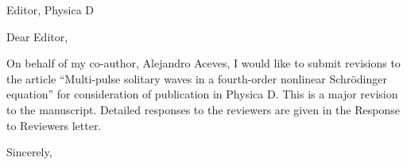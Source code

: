 \documentclass[11pt]{letter}
\begin{document}
\address{Ross Parker \\
Department of Mathematics \\
Southern Methodist University \\
Dallas, TX 75275 \\
\texttt{rhparker@smu.edu}}%
\signature{Ross Parker}
\begin{letter}{Editor, Physica D}

\opening{Dear Editor,}

On behalf of my co-author, Alejandro Aceves, I would like to submit revisions to the article ``Multi-pulse solitary waves in a fourth-order nonlinear {S}chr{\"o}dinger equation'' for consideration of publication in Physica D. This is a major revision to the manuscript. Detailed responses to the reviewers are given in the Response to Reviewers letter.

\closing{Sincerely,}

\end{letter}
\end{document}
